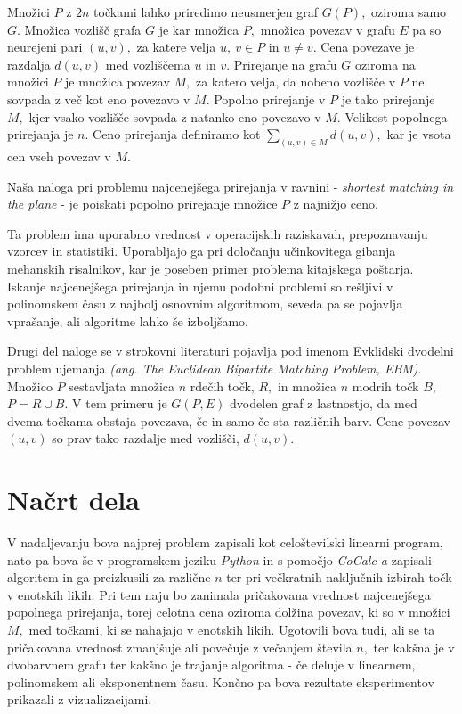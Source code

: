 \documentclass[a4paper, 11pt]{article}
\begin{document}
Množici $P$ z $2n$ točkami lahko priredimo neusmerjen graf $G(P),$ oziroma samo $G.$
Množica vozlišč grafa $G$ je kar množica $P,$ množica povezav v grafu $E$ pa so neurejeni pari $(u,v),$
za katere velja $u,~v \in P$ in $u \neq v.$ 
Cena povezave je razdalja $d(u,v)$ med vozliščema $u$ in $v.$
Prirejanje na grafu $G$ oziroma na množici $P$ je množica povezav $M,$ 
za katero velja, da nobeno vozlišče v $P$ ne sovpada z več kot eno povezavo v $M.$
Popolno prirejanje v $P$ je tako prirejanje $M,$ kjer vsako vozlišče sovpada z natanko eno povezavo v $M.$
Velikost popolnega prirejanja je $n.$ 
Ceno prirejanja definiramo kot $\sum_{(u,v) \in M} d(u,v),$ kar je vsota cen vseh povezav v $M.$

Naša naloga pri problemu najcenejšega prirejanja v ravnini - \textit{shortest matching in the plane} - je poiskati
popolno prirejanje množice $P$ z najnižjo ceno.

Ta problem ima uporabno vrednost v operacijskih raziskavah, prepoznavanju vzorcev in statistiki.
Uporabljajo ga pri določanju učinkovitega gibanja mehanskih risalnikov, kar je poseben primer problema kitajskega poštarja.
Iskanje najcenejšega prirejanja in njemu podobni problemi so rešljivi v polinomskem času z najbolj osnovnim algoritmom, 
seveda pa se pojavlja vprašanje, ali algoritme lahko še izboljšamo.

Drugi del naloge se v strokovni literaturi pojavlja pod imenom Evklidski dvodelni problem ujemanja \emph{(ang. The Euclidean Bipartite Matching Problem, EBM)}.
Množico $P$ sestavljata množica $n$ rdečih točk, $R,$ in množica $n$ modrih točk $B,$ $P=R \cup B.$
V tem primeru je $G(P,E)$ dvodelen graf z lastnostjo, da med dvema točkama obstaja povezava, če in samo če sta različnih barv.
Cene povezav $(u,v)$ so prav tako razdalje med vozlišči, $d(u,v).$

\section{Načrt dela}
V nadaljevanju bova najprej problem zapisali kot celoštevilski linearni program, nato pa bova še v programskem jeziku \textit{Python} in s pomočjo \textit{CoCalc-a} zapisali algoritem in ga preizkusili za različne $n$ ter pri večkratnih naključnih izbirah točk v enotskih likih.
Pri tem naju bo zanimala pričakovana vrednost najcenejšega popolnega prirejanja, torej celotna cena oziroma dolžina povezav, ki so v množici $M,$ med točkami, ki se nahajajo v enotskih likih.
Ugotovili bova tudi, ali se ta pričakovana vrednost zmanjšuje ali povečuje z večanjem števila $n,$ ter kakšna je v dvobarvnem grafu ter kakšno je trajanje algoritma - če deluje v linearnem, polinomskem ali eksponentnem času.
Končno pa bova rezultate eksperimentov prikazali z vizualizacijami.
\end{document}
